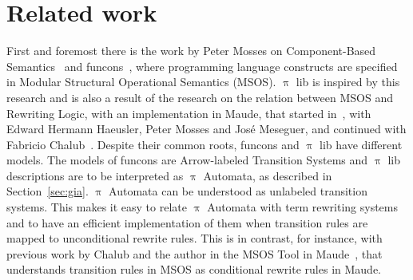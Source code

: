\documentclass[a4paper,openany]{book}
\begin{document}
\chapter{Related work}\label{sec:rel-work}

First and foremost there is the work by Peter Mosses on Component-Based Semantics~\cite{Mosses:2008:CDP:2227536.2227559} and funcons~\cite{Churchill2015,10.1007/978-3-319-12904-4-12}, where programming language constructs are specified in Modular Structural Operational Semantics (MSOS). $\uppi$ lib is inspired by this research and is also a result of the research on the relation between MSOS and Rewriting Logic, with an implementation in Maude, that started in~\cite{amast04,bragaMeseguer:WRLA04}, with Edward Hermann Haeusler, Peter Mosses and José Meseguer, and continued with Fabricio Chalub~\cite{Chalub:jucs-10-7:a-modular-rewriting-semantics,wrla06}. Despite their common roots, funcons and $\uppi$ lib have different models. The models of funcons are Arrow-labeled Transition Systems and $\uppi$ lib descriptions are to be interpreted as $\uppi$ Automata, as described in Section~\ref{sec:gia}. $\uppi$ Automata can be understood as unlabeled transition systems. This makes it easy to relate $\uppi$ Automata with term rewriting systems and to have an efficient implementation of them when transition rules are mapped to unconditional rewrite rules. This is in contrast, for instance, with previous work by Chalub and the author in the MSOS Tool in Maude~\cite{wrla06}, that understands transition rules in MSOS as conditional rewrite rules in Maude.
\end{document}
